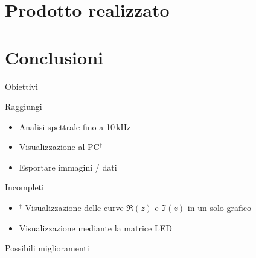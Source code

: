 \documentclass[10pt, handout]{beamer}
\begin{document}
\begin{frame}{}
\end{frame}

\section{Prodotto realizzato}

\section{Conclusioni}
\begin{frame}{Obiettivi}
    \begin{block}{Raggiungi}
    \begin{itemize}
        \item Analisi spettrale fino a 10\,kHz
        \item Visualizzazione al PC\(^\dagger\)
        \item Esportare immagini / dati
    \end{itemize}
    \end{block}
    \pause

    \begin{block}{Incompleti}
    \begin{itemize}
        \item \(^\dagger\) Visualizzazione delle curve \(\Re(z)\) e \(\Im(z)\) in un solo grafico
        \item Visualizzazione mediante la matrice LED
    \end{itemize}
    \end{block}
\end{frame}

\begin{frame}{Possibili miglioramenti}
\end{frame}
\end{document}

